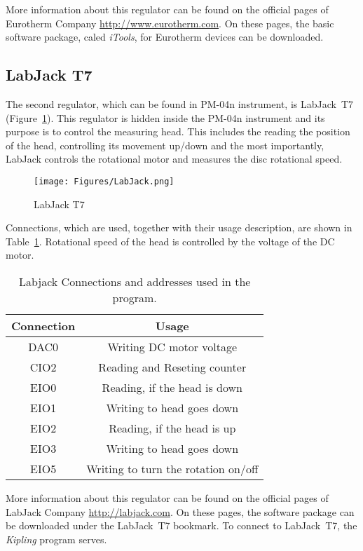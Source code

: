 \documentclass[a4paper,11pt,twoside]{book}
\theoremstyle{named}
\begin{document}
More information about this regulator can be found on the official pages of
Eurotherm Company \url{http://www.eurotherm.com}. On these pages, the basic
software package, caled \textit{iTools}, for Eurotherm devices can be
downloaded. 

\subsection{LabJack T7}
\label{sec:LabJack}

The second regulator, which can be found in PM-04n instrument, is LabJack~T7
(Figure~\ref{fig:LabJackT7}). This regulator is hidden inside the PM-04n
instrument and its purpose is to control the measuring head. This includes the
reading the position of the head, controlling its movement up/down and the most
importantly, LabJack controls the rotational motor and measures the disc
rotational speed. 

\begin{figure}[t]
  \centering
  \texttt{[image: Figures/LabJack.png]}
  \caption{LabJack T7}
  \label{fig:LabJackT7}
\end{figure}

Connections, which are used, together with their usage description, are shown in
Table~\ref{tab:LabJackConnection}. Rotational speed of the head is controlled by
the voltage of the DC motor.

\begin{table}
  \centering
  \begin{tabular}{c|c}
    \hline
    Connection  & Usage  \\
    \hline
    DAC0      & Writing DC motor voltage \\
    CIO2      & Reading and Reseting counter \\
    EIO0      & Reading, if the head is down \\
    EIO1      & Writing to head goes down \\
    EIO2      & Reading, if the head is up \\
    EIO3      & Writing to head goes down \\
    EIO5      & Writing to turn the rotation on/off \\
    \hline
  \end{tabular}
  \caption{Labjack Connections and addresses used in the program.}
  \label{tab:LabJackConnection}
\end{table}

More information about this regulator can be found on the official pages of
LabJack Company \url{http://labjack.com}. On these pages, the software
package can be downloaded under the LabJack~T7 bookmark. To connect to LabJack~T7, the
\textit{Kipling} program serves. 
\end{document}
